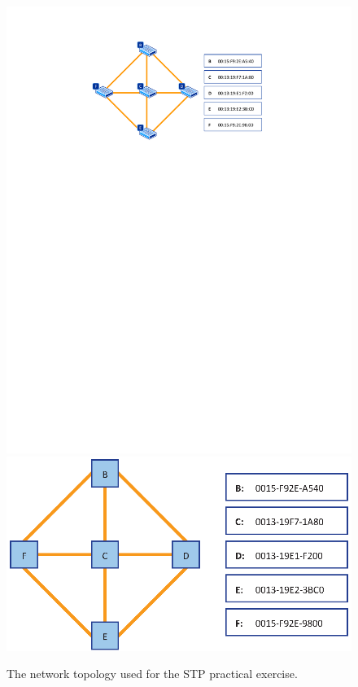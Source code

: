 \begin{figure}
\centering
\ifpdf
\includegraphics[width=0.9\linewidth]{Figures/StpTopology.pdf}
\else
\includegraphics[width=0.9\linewidth]{Figures/StpTopology.eps}
\fi
\caption{The network topology used for the STP practical exercise.}
\label{fig:StpTopology}
\end{figure}

